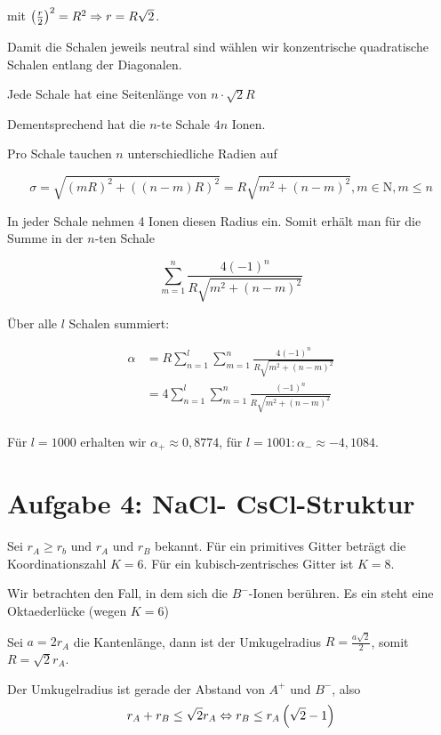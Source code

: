 \documentclass[a4paper,german,12pt,smallheadings]{scrartcl}
\begin{document}
mit $\del{\frac{r}{2}}^2 = R^2 \Rightarrow r = R \sqrt{2}$.

Damit die Schalen jeweils neutral sind wählen wir konzentrische quadratische
Schalen entlang der Diagonalen.


Jede Schale hat eine Seitenlänge von $n \cdot \sqrt{2}R$

Dementsprechend hat die $n$-te Schale $4n$ Ionen.

Pro Schale tauchen $n$ unterschiedliche Radien auf

\begin{equation}
  \sigma = \sqrt{(mR)^2 + ((n-m)R)^2} = R \sqrt{m^2 + (n-m)^2}, m \in \mathrm{N}, m \le n
\end{equation}

In jeder Schale nehmen 4 Ionen diesen Radius ein. Somit erhält man für die Summe in der $n$-ten Schale

\begin{equation}
  \sum_{m=1}^n \frac{4 (-1)^n}{R \sqrt{m^2 + (n-m)^2}}
\end{equation}

Über alle $l$ Schalen summiert:

\begin{align}
  \alpha &= R \sum_{n=1}^l \sum_{m=1}^n \frac{4 (-1)^n}{R \sqrt{m^2 + (n-m)^2}} \\
         &= 4 \sum_{n=1}^l \sum_{m=1}^n \frac{(-1)^n}{R \sqrt{m^2 + (n-m)^2}} \\
\end{align}

Für $l=1000$ erhalten wir $\alpha_+ \approx 0{,}8774$, für $l=1001: \alpha_- \approx -4{,}1084$.



\section*{Aufgabe 4: NaCl- CsCl-Struktur}

Sei $r_A \ge r_b$ und $r_A$ und $r_B$ bekannt. Für ein primitives Gitter
beträgt die Koordinationszahl $K = 6$. Für ein kubisch-zentrisches Gitter ist
$K=8$.

Wir betrachten den Fall, in dem sich die $B^-$-Ionen berühren. Es ein steht
eine Oktaederlücke (wegen $K = 6$)

Sei $a = 2 r_A$ die Kantenlänge, dann ist der Umkugelradius $R = \frac{a
\sqrt{2}}{2}$, somit $R = \sqrt{2} r_A$.

Der Umkugelradius ist gerade der Abstand von $A^+$ und $B^-$, also
\begin{equation}
  r_A + r_B \le \sqrt{2} r_A \Leftrightarrow r_B \le r_A \del{\sqrt{2} - 1}
\end{equation}
\end{document}
